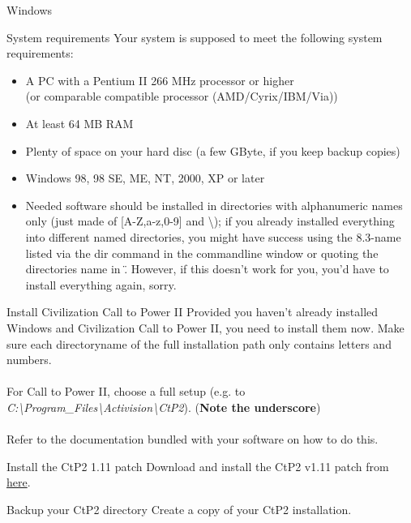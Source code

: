 \begin{section}{Windows}
\begin{subsection}{System requirements}
Your system is supposed to meet the following system requirements:
\begin{itemize}
\item A PC with a Pentium II 266 MHz processor or higher\\
(or comparable compatible processor (AMD/Cyrix/IBM/Via))
\item At least 64 MB RAM
\item Plenty of space on your hard disc (a few GByte, if you keep backup copies)
\item Windows 98, 98 SE, ME, NT, 2000, XP or later
\item Needed software should be installed in directories with alphanumeric names only (just made of [A-Z,a-z,0-9] and \textbackslash{});
if you already installed everything into different named directories, you might have success using the 8.3-name listed via the dir command in the commandline window or quoting the directories name in \". However, if this doesn't work for you, you'd have to install everything again, sorry.
\end{itemize}
\end{subsection}%

\begin{subsection}{Install Civilization Call to Power II}
Provided you haven't already installed Windows and Civilization Call to Power II, you need to install them now. Make sure each directoryname of the full installation path only contains letters and numbers.\\
\\
For Call to Power II, choose a full setup (e.g. to \textit{C:\textbackslash{}Program\_Files\textbackslash{}Activision\textbackslash{}CtP2}). (\textbf{Note the underscore})\\
\\
Refer to the documentation bundled with your software on how to do this.
\end{subsection}%

\begin{subsection}{Install the CtP2 1.11 patch}
Download and install the CtP2 v1.11 patch from \href{http://apolyton.net/ctp2/}{here}.
\end{subsection}%

\begin{subsection}{Backup your CtP2 directory}
Create a copy of your CtP2 installation.
\end{subsection}%


\end{section}
